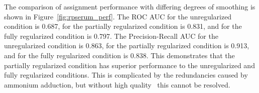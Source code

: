    The comparison of assignment performance with differing degrees of smoothing is
    shown in Figure~\ref{fig:rpserum_perf}. The ROC AUC for the unregularized condition
    is 0.687, for the partially regularized condition is 0.831, and for the fully
    regularized condition is 0.797. The Precision-Recall AUC for the unregularized condition
    is 0.863, for the partially regularized condition is 0.913, and for the fully regularized
    condition is 0.838. This demonstrates that the partially regularized condition has superior
    performance to the unregularized and fully regularized conditions. This is complicated by
    the redundancies caused by ammonium adduction, but without high quality \msn \ this cannot
    be resolved.
